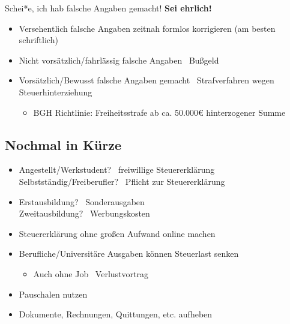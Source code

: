 \documentclass{beamer}
\begin{document}
			\begin{frame}{Schei*e, ich hab falsche Angaben gemacht!}
				\textbf{Sei ehrlich!}\n
				\begin{itemize}
					\item Versehentlich falsche Angaben zeitnah formlos korrigieren (am besten schriftlich)
					\item Nicht vorsätzlich/fahrlässig falsche Angaben \textrightarrow\ Bußgeld
					\item Vorsätzlich/Bewusst falsche Angaben gemacht \textrightarrow\ Strafverfahren wegen Steuerhinterziehung
					\begin{itemize}
						\item BGH Richtlinie: Freiheitsstrafe ab ca. 50.000€ hinterzogener Summe
					\end{itemize}
				\end{itemize}
			\end{frame}
		
		\subsection{Nochmal in Kürze}
		
			\begin{frame}
				\begin{itemize}
					\item Angestellt/Werkstudent? \textrightarrow\ freiwillige Steuererklärung\\
					Selbstständig/Freiberufler? \textrightarrow\ Pflicht zur Steuererklärung
					\item Erstausbildung? \textrightarrow\ Sonderausgaben\\
					Zweitausbildung? \textrightarrow\ Werbungskosten\vspace{-0.1cm}\pause
					\item Steuererklärung ohne großen Aufwand online machen\pause
					\item Berufliche/Universitäre Ausgaben können Steuerlast senken
					\begin{itemize}
						\item Auch ohne Job \textrightarrow\ Verlustvortrag
					\end{itemize}
					\item Pauschalen nutzen
					\item Dokumente, Rechnungen, Quittungen, etc. aufheben\pause
				\end{itemize}
			\end{frame}
		
\end{document}
